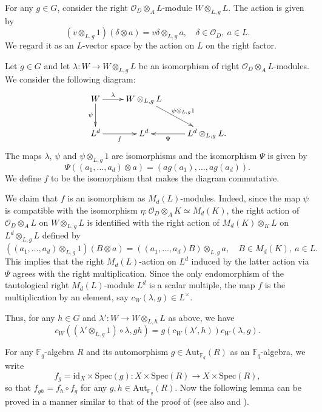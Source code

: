 \documentclass[10pt]{amsart}
\theoremstyle{plain}
\theoremstyle{definition}
\newcommand{\Aut}{\mathrm{Aut}}
\newcommand{\id}{\mathrm{id}}
\newcommand{\Spec}{\mathrm{Spec}}
\newcommand{\cO}{\mathcal{O}}
\newcommand{\bF}{\mathbb{F}}
\begin{document}
For any $g\in G$, consider the right $\cO_D\otimes_A L$-module $W\otimes_{L,g}L$. The action is given by
\[
(v\otimes_{L,g}1)(\delta\otimes a)=v\delta\otimes_{L,g}a,\quad \delta\in \cO_D,\ a\in L.
\]
We regard it as an $L$-vector space by the action on $L$ on the right factor.

Let $g\in G$ and let $\lambda: W\to W\otimes_{L,g}L$ be an isomorphism of right $\cO_D\otimes_A L$-modules.
We consider the following diagram:
\begin{equation}\label{EqnCanConst}
	\begin{gathered}
\xymatrix{
W\ar[r]^-{\lambda}\ar[d]_-{\psi} & W\otimes_{L,g}L\ar[dr]^{\psi\otimes_{L,g}1}&\\
L^d \ar[r]_f& L^d & L^d\otimes_{L,g}L. \ar[l]^-{\Psi}
}
\end{gathered}
\end{equation}
The maps $\lambda$, $\psi$ and $\psi\otimes_{L,g}1$ are isomorphisms 
and the isomorphism $\Psi$ is given by 
\[
\Psi((a_1,\ldots,a_d)\otimes a)=(ag(a_1),\ldots,ag(a_d)).
\]
We define $f$ to be the isomorphism that makes the diagram commutative.

We claim that $f$ is an isomorphism as $M_d(L)$-modules. Indeed, since the map $\psi$ is 
compatible with the isomorphism $\eta:\cO_D\otimes_A K\simeq M_d(K)$,
the right action of $\cO_D\otimes_A L$ on $W\otimes_{L,g}L$ is identified with
the right action of $M_d(K)\otimes_K L$ on $L^d\otimes_{L,g}L$ defined by
\[
((a_1,\ldots,a_d)\otimes_{L,g}1)(B\otimes a)=((a_1,\ldots,a_d)B)\otimes_{L,g} a,\quad B\in M_d(K),\ a\in L.
\]
This implies that the right $M_d(L)$-action on $L^d$ induced by the latter action via $\Psi$ agrees with the right multiplication.
Since the only endomorphism of the tautological right $M_d(L)$-module $L^d$ is a scalar multiple, 
the map $f$ is the multiplication by an element, say $c_W(\lambda,g)\in L^\times$.

Thus, for any $h\in G$ and $\lambda':W\to W\otimes_{L,h}L$ as above, we have
\begin{equation}\label{EqnTransCanConst}
c_W((\lambda'\otimes_{L,g}1)\circ \lambda,gh)=g(c_W(\lambda',h))c_W(\lambda,g).
\end{equation}

For any $\bF_q$-algebra $R$ and its automorphism $g\in \Aut_{\bF_q}(R)$ as an $\bF_q$-algebra,
we write 
\[
f_g=\id_X\times \Spec(g):X\times \Spec(R)\to X\times \Spec(R),
\]
so that $f_{gh}=f_h\circ f_g$ for any $g,h\in \Aut_{\bF_q}(R)$. Now the following lemma
can be proved in a manner similar to that of the proof of \cite[Theorem 9.5]{Shimura} (see also \cite[Proposition 1.3]{Jordan} and \cite[Theorem 6.13]{Pap}).
\end{document}
